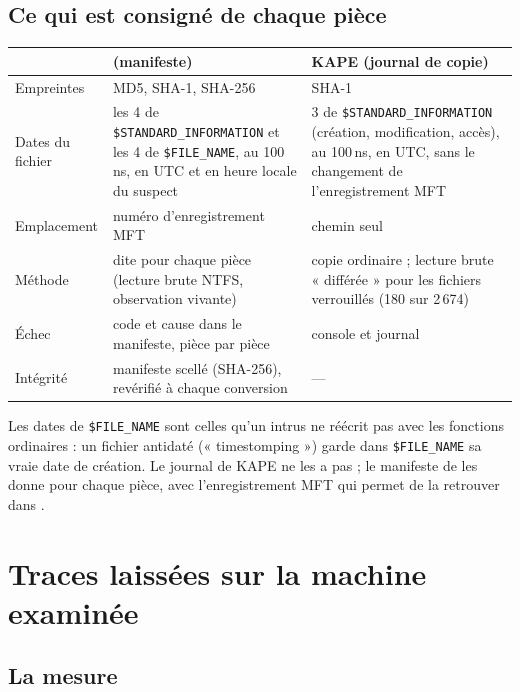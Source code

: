\documentclass[11pt,a4paper,oneside]{report}
\begin{document}
\section{Ce qui est consigné de chaque pièce}

\begin{longtable}{@{}L{3.6cm}L{6.0cm}L{5.4cm}@{}}
\toprule
 & \textbf{\wac{} (manifeste)} & \textbf{KAPE (journal de copie)} \\
\midrule\endhead
Empreintes & MD5, SHA-1, SHA-256 & SHA-1 \\
Dates du fichier & les 4 de \texttt{\$STANDARD\_INFORMATION} et les 4 de
  \texttt{\$FILE\_NAME}, au 100\,ns, en UTC et en heure locale du suspect &
  3 de \texttt{\$STANDARD\_INFORMATION} (création, modification, accès), au
  100\,ns, en UTC, sans le changement de l'enregistrement MFT \\
Emplacement & numéro d'enregistrement MFT & chemin seul \\
Méthode & dite pour chaque pièce (lecture brute NTFS, observation vivante) &
  copie ordinaire ; lecture brute « différée » pour les fichiers verrouillés
  (180 sur 2\,674) \\
Échec & code et cause dans le manifeste, pièce par pièce & console et journal \\
Intégrité & manifeste scellé (SHA-256), revérifié à chaque conversion & --- \\
\bottomrule
\end{longtable}

\begin{note}
Les dates de \texttt{\$FILE\_NAME} sont celles qu'un intrus ne réécrit pas
avec les fonctions ordinaires : un fichier antidaté (« timestomping ») garde
dans \texttt{\$FILE\_NAME} sa vraie date de création. Le journal de KAPE ne les
a pas ; le manifeste de \wac{} les donne pour chaque pièce, avec l'enregistrement
MFT qui permet de la retrouver dans .
\end{note}

\chapter{Traces laissées sur la machine examinée}\label{chap:traces}

\section{La mesure}
\end{document}
